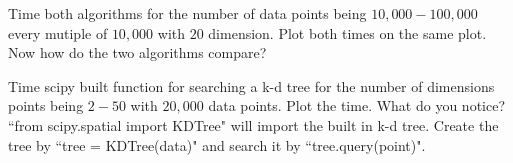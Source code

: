 \begin{problem}
Time both algorithms for the number of data points being $10,000-100,000$ every mutiple of $10,000$ with $20$ dimension. Plot both times on the same plot. Now how do the two algorithms compare?
\end{problem}

\begin{problem}
Time scipy built function for searching a k-d tree for the number of dimensions points being $2-50$ with $20,000$ data points. Plot the time. What do you notice? ``from scipy.spatial import KDTree" will import the built in k-d tree. Create the tree by ``tree = KDTree(data)" and search it by ``tree.query(point)".
\end{problem}


